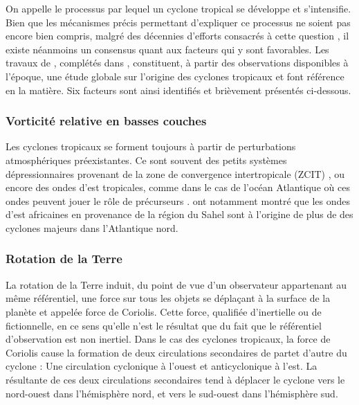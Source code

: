 \documentclass[../main.tex]{subfiles}
\begin{document}
On appelle  le processus par lequel un cyclone tropical se développe et s'intensifie. Bien que les mécanismes précis permettant
d'expliquer ce processus ne soient pas encore bien compris, malgré des décennies d'efforts consacrés à cette question \parencite{yanai_formation_1964, gray_global_1968, 
montgomery_tropical_1993, gray_formation_1998, tory_tropical_2010}, il existe néanmoins un consensus quant aux facteurs qui y sont favorables. Les travaux de
\textcite{gray_global_1968}, complétés dans \textcite{gray_tropical_1975}, constituent, à partir des observations disponibles à l'époque, une étude globale sur
l'origine des cyclones tropicaux et font référence en la matière. Six facteurs sont ainsi identifiés et brièvement présentés ci-dessous.

\subsubsection*{Vorticité relative en basses couches}

Les cyclones tropicaux se forment toujours à partir de perturbations atmosphériques préexistantes. Ce sont souvent des petits systèmes dépressionnaires
provenant de la zone de convergence intertropicale (ZCIT) \parencite{gray_global_1968}, ou encore des ondes d'est tropicales, comme dans le cas de l'océan
Atlantique où ces ondes peuvent jouer le rôle de précurseurs \parencite{thorncroft_african_2001,patricola_response_2018}. \textcite{landsea_strong_1992} ont
notamment montré que les ondes d'est africaines en provenance de la région du Sahel sont à l'origine de plus de  des cyclones majeurs dans l'Atlantique
nord.

\subsubsection*{Rotation de la Terre}

La rotation de la Terre induit, du point de vue d'un observateur appartenant au même référentiel, une force sur tous les objets se déplaçant à la surface de la
planète et appelée force de Coriolis. Cette force, qualifiée d'inertielle ou de fictionnelle, en ce sens qu'elle n'est le résultat que du fait que le
référentiel d'observation est non inertiel. Dans le cas des cyclones tropicaux, la force de Coriolis cause la formation de deux circulations secondaires de
partet d'autre du cyclone : Une circulation cyclonique à l'ouest et anticyclonique à l'est. La résultante de ces deux circulations secondaires tend à déplacer
le cyclone vers le nord-ouest dans l'hémisphère nord, et vers le sud-ouest dans l'hémisphère sud.
\end{document}
